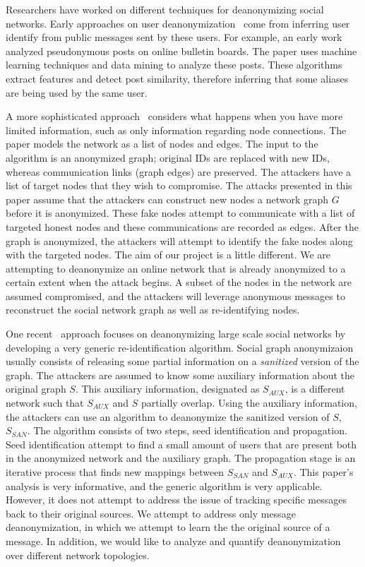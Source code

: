 Researchers have worked on different techniques for deanonymizing social networks. Early approaches on user deanonymization~\cite{novak2004anti,narayanan2006break} come from inferring user identify from public messages sent by these users. For example, an early work~\cite{novak2004anti} analyzed pseudonymous posts on online bulletin boards. The paper uses machine learning techniques and data mining to analyze these posts. These algorithms extract features and detect post similarity, therefore inferring that some aliases are being used by the same user. 

A more sophisticated approach~\cite{backstrom2007wherefore} considers what happens when you have more limited information, such as only information regarding node connections. The paper models the network as a list of nodes and edges. The input to the algorithm is an anonymized graph; original IDs are replaced with new IDs, whereas communication links (graph edges) are preserved. The attackers have a list of target nodes that they wish to compromise.
The attacks presented in this paper assume that the attackers can construct new nodes a network graph $G$ before it is anonymized. These fake nodes attempt to communicate with a list of targeted honest nodes and these communications are recorded as edges. After the graph is anonymized, the attackers will attempt to identify the fake nodes along with the targeted nodes. 
The aim of our project is a little different. We are attempting to deanonymize an online network that is already anonymized to a certain extent when the attack begins. A subset of the nodes in the network are assumed compromised, and the attackers will leverage anonymous messages to reconstruct the social network graph as well as re-identifying nodes. 

One recent~\cite{narayanan2009anonymizing} approach focuses on deanonymizing large scale social networks by developing a very generic re-identification algorithm. Social graph anonymizaion usually consists of releasing some partial information on a \emph{sanitized} version of the graph. 
The attackers are assumed to know some auxiliary information about the original graph $S$. This auxiliary information, designated as $S_{AUX}$, is a different network such that $S_{AUX}$ and $S$ partially overlap. Using the auxiliary information, the attackers can use an algorithm to deanonymize the sanitized version of $S$, $S_{SAN}$.
The algorithm consists of two steps, seed identification and propagation. Seed identification attempt to find a small amount of users that are present both in the anonymized network and the auxiliary graph. The propagation stage is an iterative process that finds new mappings between $S_{SAN}$ and $S_{AUX}$. This paper's analysis is very informative, and the generic algorithm is very applicable. However, it does not attempt to address the issue of tracking specific messages back to their original sources. We attempt to address only message deanonymization, in which we attempt to learn the the original source of a message. In addition, we would like to analyze and quantify deanonymization over different network topologies.

